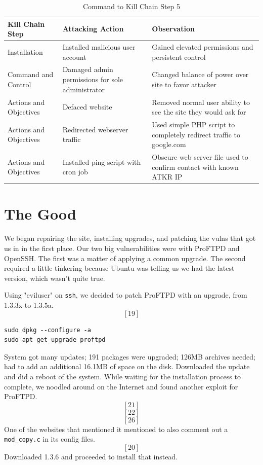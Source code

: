 \begin{table}[H]
\caption{Command to Kill Chain Step 5}
\centering
\begin{tabular}{|l|l|l|}
\hline
Kill Chain Step & Attacking Action & Observation \\
\hline
Installation & Installed malicious user account & Gained elevated permissions and persistent control \\
Command and Control & Damaged admin permissions for sole administrator & Changed balance of power over site to favor attacker \\
Actions and Objectives & Defaced website & Removed normal user ability to see the site they would ask for \\
Actions and Objectives & Redirected webserver traffic & Used simple PHP script to completely redirect traffic to google.com \\
Actions and Objectives & Installed ping script with cron job & Obscure web server file used to confirm contact with known ATKR IP \\
\hline
\end{tabular}
\end{table}

\section{The Good}
We began repairing the site, installing upgrades, and patching the vulns that got us in in the first place.  Our two big vulnerabilities were with ProFTPD and OpenSSH.  The first was a matter of applying a common upgrade.  The second required a little tinkering because Ubuntu was telling us we had the latest version, which wasn't quite true.

Using "eviluser" on \texttt{ssh}, we decided to patch ProFTPD with an upgrade, from 1.3.3x to 1.3.5a. \[[19]\]

\begin{lstlisting}
sudo dpkg --configure -a
sudo apt-get upgrade proftpd
\end{lstlisting}


System got many updates; 191 packages were upgraded; 126MB archives needed; had to add an additional 16.1MB of space on the disk.  Downloaded the update and did a reboot of the system.  While waiting for the installation process to complete, we noodled around on the Internet and found another exploit for ProFTPD. \[[21]\] \[[22]\] \[[26]\] One of the websites that mentioned it mentioned to also comment out a \texttt{mod\_copy.c} in its config files. \[[20]\] Downloaded 1.3.6 and proceeded to install that instead.

